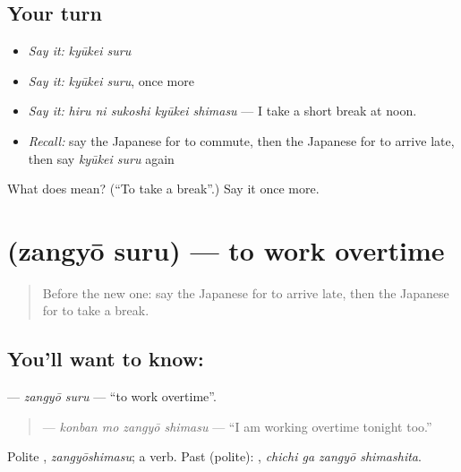 \subsection*{Your turn}
\begin{itemize}
\raggedright
  \item \emph{Say it:} \emph{kyūkei suru}
  \item \emph{Say it:} \emph{kyūkei suru}, once more
  \item \emph{Say it:} \emph{hiru ni sukoshi kyūkei shimasu} — I take a short break at noon.
  \item \emph{Recall:} say the Japanese for to commute, then the Japanese for to arrive late, then say \emph{kyūkei suru} again
\end{itemize}

\begin{tcolorbox}[breakable,colback=teal!4,colframe=teal!35!black,title={Before you move on}]
What does  mean? (\textquotedblleft{}To take a break\textquotedblright{}.) Say it once more.
\end{tcolorbox}
\section[\texorpdfstring{\ja{ざんぎょうする} (zangyō suru)}{ざんぎょうする (zangyō suru)}]{ (zangyō suru) — to work overtime}

\label{lesson:JA-C451-zangyou-suru}



\begin{quote}
Before the new one: say the Japanese for to arrive late, then the Japanese for to take a break.
\end{quote}

\subsection*{You'll want to know: }
\textbf{} — \emph{zangyō suru} — \textquotedblleft{}to work overtime\textquotedblright{}.

\begin{quote}
\textbf{ } — \emph{konban mo zangyō shimasu} — \textquotedblleft{}I am working overtime tonight too.\textquotedblright{}
\end{quote}

Polite \textbf{}, \emph{zangyōshimasu}; a  verb. Past (polite): \textbf{ }, \emph{chichi ga zangyō shimashita}.

